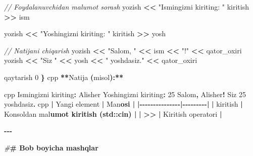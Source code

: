 \documentclass[a4paper,11pt,twoside,openright]{book}
\newenvironment{Shaded}{\begin{snugshade}}{\end{snugshade}}
\newcommand{\CharTok}[1]{\textcolor[rgb]{0.31,0.60,0.02}{#1}}
\newcommand{\CommentTok}[1]{\textcolor[rgb]{0.56,0.35,0.01}{\textit{#1}}}
\newcommand{\DecValTok}[1]{\textcolor[rgb]{0.00,0.00,0.81}{#1}}
\newcommand{\ErrorTok}[1]{\textcolor[rgb]{0.64,0.00,0.00}{\textbf{#1}}}
\newcommand{\NormalTok}[1]{#1}
\newcommand{\OperatorTok}[1]{\textcolor[rgb]{0.81,0.36,0.00}{\textbf{#1}}}
\newcommand{\PreprocessorTok}[1]{\textcolor[rgb]{0.56,0.35,0.01}{\textit{#1}}}
\newcommand{\StringTok}[1]{\textcolor[rgb]{0.31,0.60,0.02}{#1}}
\begin{document}
\begin{Shaded}
\begin{Highlighting}[]
    \CommentTok{// Foydalanuvchidan ma\textquotesingle{}lumot so\textquotesingle{}rash}
\NormalTok{    yozish }\OperatorTok{\textless{}\textless{}} \StringTok{"Ismingizni kiriting: "}
\NormalTok{    kiritish }\OperatorTok{\textgreater{}\textgreater{}}\NormalTok{ ism}

\NormalTok{    yozish }\OperatorTok{\textless{}\textless{}} \StringTok{"Yoshingizni kiriting: "}
\NormalTok{    kiritish }\OperatorTok{\textgreater{}\textgreater{}}\NormalTok{ yosh}

    \CommentTok{// Natijani chiqarish}
\NormalTok{    yozish }\OperatorTok{\textless{}\textless{}} \StringTok{"Salom, "} \OperatorTok{\textless{}\textless{}}\NormalTok{ ism }\OperatorTok{\textless{}\textless{}} \StringTok{"!"} \OperatorTok{\textless{}\textless{}}\NormalTok{ qator\_oxiri}
\NormalTok{    yozish }\OperatorTok{\textless{}\textless{}} \StringTok{"Siz "} \OperatorTok{\textless{}\textless{}}\NormalTok{ yosh }\OperatorTok{\textless{}\textless{}} \StringTok{" yoshdasiz."} \OperatorTok{\textless{}\textless{}}\NormalTok{ qator\_oxiri}

\NormalTok{    qaytarish }\DecValTok{0}
\OperatorTok{\}}
\ErrorTok{\textasciigrave{}\textasciigrave{}\textasciigrave{}}\NormalTok{cpp}
\OperatorTok{**}\NormalTok{Natija }\OperatorTok{(}\NormalTok{misol}\OperatorTok{):**}

\ErrorTok{\textasciigrave{}\textasciigrave{}\textasciigrave{}}\NormalTok{cpp}
\NormalTok{Ismingizni kiriting}\OperatorTok{:}\NormalTok{ Alisher}
\NormalTok{Yoshingizni kiriting}\OperatorTok{:} \DecValTok{25}
\NormalTok{Salom}\OperatorTok{,}\NormalTok{ Alisher}\OperatorTok{!}
\NormalTok{Siz }\DecValTok{25}\NormalTok{ yoshdasiz}\OperatorTok{.}
\ErrorTok{\textasciigrave{}\textasciigrave{}\textasciigrave{}}\NormalTok{cpp}
\OperatorTok{|}\NormalTok{ Yangi element }\OperatorTok{|}\NormalTok{ Ma}\CharTok{\textquotesingle{}n}\ErrorTok{osi |}
\OperatorTok{|{-}{-}{-}{-}{-}{-}{-}{-}{-}{-}{-}{-}{-}{-}{-}|{-}{-}{-}{-}{-}{-}{-}{-}{-}|}
\OperatorTok{|} \ErrorTok{\textasciigrave{}}\NormalTok{kiritish}\ErrorTok{\textasciigrave{}} \OperatorTok{|}\NormalTok{ Konsoldan ma}\CharTok{\textquotesingle{}l}\ErrorTok{umot kiritish (\textasciigrave{}std::cin\textasciigrave{}) |}
\OperatorTok{|} \ErrorTok{\textasciigrave{}}\OperatorTok{\textgreater{}\textgreater{}}\ErrorTok{\textasciigrave{}} \OperatorTok{|}\NormalTok{ Kiritish operatori }\OperatorTok{|}

\OperatorTok{{-}{-}{-}}

\PreprocessorTok{\#}\ErrorTok{\# Bob bo\textquotesingle{}yicha mashqlar}


\end{Highlighting}
\end{Shaded}
\end{document}
